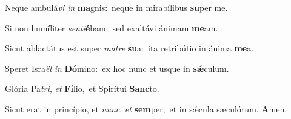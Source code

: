 \vs Neque ambulá\textit{vi} \textit{in} \textbf{ma}gnis:~\redgreheightstar neque in mirabílibus \textbf{su}per me.

\vs Si non humíliter \textit{sen}\textit{ti}\textbf{é}bam:~\redgreheightstar sed exaltávi ánimam \textbf{me}am.

\vs Sicut ablactátus est super \textit{ma}\textit{tre} \textbf{su}a:~\redgreheightstar ita retribútio in ánima \textbf{me}a.

\vs Speret Isra\textit{ël} \textit{in} \textbf{Dó}mino:~\redgreheightstar ex hoc nunc et usque in \textbf{sǽ}culum.

\vs Glória Pa\textit{tri}, \textit{et} \textbf{Fí}lio,~\redgreheightstar et Spirítui \textbf{Sanc}to.

\vs Sicut erat in princípio, et \textit{nunc}, \textit{et} \textbf{sem}per,~\redgreheightstar et in sǽcula sæculórum. \textbf{A}men.

